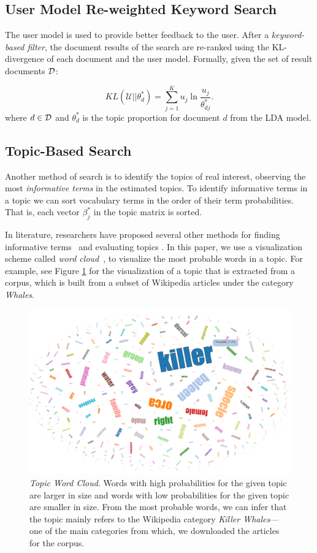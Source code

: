 \documentclass[letterpaper]{article}
\begin{document}
\subsection{User Model Re-weighted Keyword Search}
The user model is used to provide better feedback to
the user. After a \textsl{keyword-based filter}, the document results of the search 
are re-ranked using the KL-divergence of each document and the
user model. Formally, given the set of result documents $\cal D$:

\begin{equation} \label{eq:KL}
KL(\mathcal{U}||\theta^*_{d}) = \sum_{j = 1}^K u_j \ln \frac{u_j}{\theta^*_{dj}}.
\end{equation}
where $d \in {\cal D}$ and $\theta^*_{d}$ is the topic proportion 
for document $d$ from the LDA model. 


\subsection{Topic-Based Search}

Another method of search is to identify the topics of 
real interest, observing the most \textsl{informative terms} in 
the estimated topics. 
To identify informative terms in a topic we can sort vocabulary 
terms in the order of their term probabilities.
That is, each vector $\beta_j^{*}$ in the topic matrix is sorted.
  
In literature, researchers have proposed several other methods for 
finding informative terms~\cite{2012-termite} and evaluating topics 
\cite{mimno2011optimizing}. In this paper, we use a visualization 
scheme called \textsl{word cloud}~\cite{Davis2013}, to visualize the 
most probable words in a topic. For example, see Figure 
\ref{fig:topic-word-cloud} for the visualization of a topic that is 
extracted from a corpus, which is built from a subset of Wikipedia 
articles under the category \textsl{Whales}. 
       
\begin{figure}[htb]\centering 
\includegraphics[width=.8\textwidth]{topic_visualization.png}
\caption{\textsl{Topic Word Cloud}. Words with high probabilities for the 
given topic are larger in size and words with low probabilities for 
the given topic are smaller in size. From the most probable words, 
we can infer that the topic mainly refers to the Wikipedia category 
\textit{Killer Whales}---one of the main categories from which, we 
downloaded the articles for the corpus.}
\label{fig:topic-word-cloud}
\end{figure}
\end{document}
